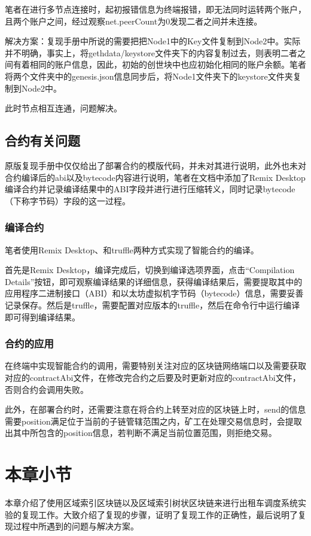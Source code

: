 笔者在进行多节点连接时，起初报错信息为终端报错，即无法同时运转两个账户，且两个账户之间，经过观察net.peerCount为0发现二者之间并未连接。

解决方案：复现手册中所说的需要把把Node1中的Key文件复制到Node2中。实际并不明确，事实上，将gethdata/keystore文件夹下的内容复制过去，则表明二者之间有着相同的账户信息，因此，初始的创世块中也应初始化相同的账户余额。笔者将两个文件夹中的genesis.json信息同步后，将Node1文件夹下的keystore文件夹复制到Node2中。
	
此时节点相互连通，问题解决。

\subsection{合约有关问题}

原版复现手册中仅仅给出了部署合约的模版代码，并未对其进行说明，此外也未对合约编译后的abi以及bytecode内容进行说明，笔者在文档中添加了Remix Desktop编译合约并记录编译结果中的ABI字段并进行进行压缩转义，同时记录bytecode（下称字节码）字段的这一过程。

\subsubsection{编译合约}

笔者使用Remix Desktop、和truffle两种方式实现了智能合约的编译。

首先是Remix Desktop，编译完成后，切换到编译选项界面，点击“Compilation Details”按钮，即可观察编译结果的详细信息，获得编译结果后，需要提取其中的应用程序二进制接口（ABI）和以太坊虚拟机字节码（bytecode）信息，需要妥善记录保存。然后是truffle，需要配置对应版本的truffle，然后在命令行中运行编译即可得到编译结果。

\subsubsection{合约的应用}

在终端中实现智能合约的调用，需要特别关注对应的区块链网络端口以及需要获取对应的contractAbi文件，在修改完合约之后要及时更新对应的contractAbi文件，否则合约会调用失败。

此外，在部署合约时，还需要注意在将合约上转至对应的区块链上时，send的信息需要position满足位于当前的子链管辖范围之内，矿工在处理交易信息时，会提取出其中所包含的position信息，若判断不满足当前位置范围，则拒绝交易。

\section{本章小节}

本章介绍了使用区域索引区块链以及区域索引树状区块链来进行出租车调度系统实验的复现工作。大致介绍了复现的步骤，证明了复现工作的正确性，最后说明了复现过程中所遇到的问题与解决方案。